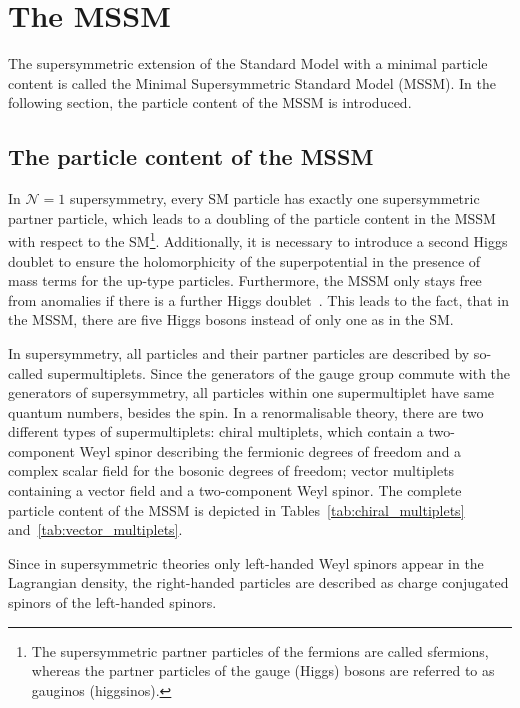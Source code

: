 \section{The MSSM}
\label{sec:MSSM}
The supersymmetric extension of the Standard Model with a minimal particle content is called the Minimal Supersymmetric Standard Model (MSSM).
In the following section, the particle content of the MSSM is introduced.

\subsection{The particle content of the MSSM}
In $\mathcal{N}=1$ supersymmetry, every SM particle has exactly one supersymmetric partner particle, which leads to a doubling of the particle content in the MSSM with respect to the SM\footnote{The supersymmetric partner particles of the fermions are called sfermions, whereas the partner particles of the gauge (Higgs) bosons are referred to as gauginos (higgsinos).}.
Additionally, it is necessary to introduce a second Higgs doublet to ensure the holomorphicity of the superpotential in the presence of mass terms for the up-type particles.
Furthermore, the MSSM only stays free from anomalies if there is a further Higgs doublet~\cite{bib:SUSYPrimer}.
This leads to the fact, that in the MSSM, there are five Higgs bosons instead of only one as in the SM.

In supersymmetry, all particles and their partner particles are described by so-called supermultiplets.
Since the generators of the gauge group commute with the generators of supersymmetry, all particles within one supermultiplet have same quantum numbers, besides the spin.
In a renormalisable theory, there are two different types of supermultiplets: chiral multiplets, which contain a two-component Weyl spinor describing the fermionic degrees of freedom and a complex scalar field for the bosonic degrees of freedom; vector multiplets containing a vector field and a two-component Weyl spinor.
The complete particle content of the MSSM is depicted in Tables~\ref{tab:chiral_multiplets} and~\ref{tab:vector_multiplets}.

Since in supersymmetric theories only left-handed Weyl spinors appear in the Lagrangian density, the right-handed particles are described as charge conjugated spinors of the left-handed spinors.

